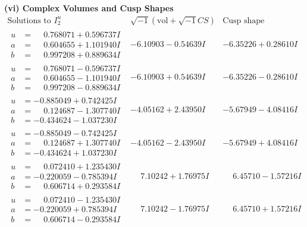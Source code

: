 \documentclass[1p]{elsarticle_modified}
\theoremstyle{definition}
\newcommand{\I}{\sqrt{-1}}
\begin{document}
\newpage\flushleft \textbf{(vi) Complex Volumes and Cusp Shapes}
$$\begin{array}{c|c|c}  
\text{Solutions to }I^u_{2}& \I (\text{vol} + \sqrt{-1}CS) & \text{Cusp shape}\\
 \hline 
\begin{aligned}
u &= \phantom{-}0.768071 + 0.596737 I \\
a &= \phantom{-}0.604655 + 1.101940 I \\
b &= \phantom{-}0.997208 + 0.889634 I\end{aligned}
 & -6.10903 - 0.54639 I & -6.35226 + 0.28610 I \\ \hline\begin{aligned}
u &= \phantom{-}0.768071 - 0.596737 I \\
a &= \phantom{-}0.604655 - 1.101940 I \\
b &= \phantom{-}0.997208 - 0.889634 I\end{aligned}
 & -6.10903 + 0.54639 I & -6.35226 - 0.28610 I \\ \hline\begin{aligned}
u &= -0.885049 + 0.742425 I \\
a &= \phantom{-}0.124687 - 1.307740 I \\
b &= -0.434624 - 1.037230 I\end{aligned}
 & -4.05162 + 2.43950 I & -5.67949 - 4.08416 I \\ \hline\begin{aligned}
u &= -0.885049 - 0.742425 I \\
a &= \phantom{-}0.124687 + 1.307740 I \\
b &= -0.434624 + 1.037230 I\end{aligned}
 & -4.05162 - 2.43950 I & -5.67949 + 4.08416 I \\ \hline\begin{aligned}
u &= \phantom{-}0.072410 + 1.235430 I \\
a &= -0.220059 - 0.785394 I \\
b &= \phantom{-}0.606714 + 0.293584 I\end{aligned}
 & \phantom{-}7.10242 + 1.76975 I & \phantom{-}6.45710 - 1.57216 I \\ \hline\begin{aligned}
u &= \phantom{-}0.072410 - 1.235430 I \\
a &= -0.220059 + 0.785394 I \\
b &= \phantom{-}0.606714 - 0.293584 I\end{aligned}
 & \phantom{-}7.10242 - 1.76975 I & \phantom{-}6.45710 + 1.57216 I \\ \hline\begin{aligned}

\end{aligned}
\end{array}$$
\end{document}
